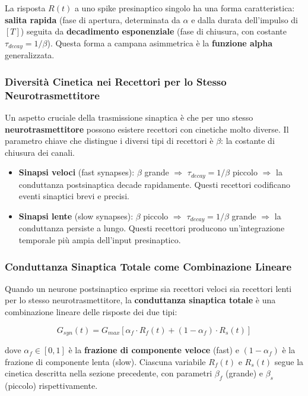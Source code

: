La risposta $R(t)$ a uno spike presinaptico singolo ha una forma caratteristica: \textbf{salita rapida} (fase di apertura, determinata da $\alpha$ e dalla durata dell'impulso di $[T]$) seguita da \textbf{decadimento esponenziale} (fase di chiusura, con costante $\tau_{decay} = 1/\beta$). Questa forma a campana asimmetrica è la \textbf{funzione alpha} generalizzata.


\subsubsection{Diversità Cinetica nei Recettori per lo Stesso Neurotrasmettitore}

Un aspetto cruciale della trasmissione sinaptica è che per uno stesso \textbf{neurotrasmettitore} possono esistere recettori con cinetiche molto diverse. Il parametro chiave che distingue i diversi tipi di recettori è $\beta$: la costante di chiusura dei canali.

\begin{itemize}
    \item \textbf{Sinapsi veloci} (fast synapses): $\beta$ grande $\Rightarrow$ $\tau_{decay} = 1/\beta$ piccolo $\Rightarrow$ la conduttanza postsinaptica decade rapidamente. Questi recettori codificano eventi sinaptici brevi e precisi.
    \item \textbf{Sinapsi lente} (slow synapses): $\beta$ piccolo $\Rightarrow$ $\tau_{decay} = 1/\beta$ grande $\Rightarrow$ la conduttanza persiste a lungo. Questi recettori producono un'integrazione temporale più ampia dell'input presinaptico.
\end{itemize}

\subsubsection{Conduttanza Sinaptica Totale come Combinazione Lineare}

Quando un neurone postsinaptico esprime sia recettori veloci sia recettori lenti per lo stesso neurotrasmettitore, la \textbf{conduttanza sinaptica totale} è una combinazione lineare delle risposte dei due tipi:

\begin{equation}
G_{syn}(t) = G_{max} \left[ \alpha_f \cdot R_f(t) + (1 - \alpha_f) \cdot R_s(t) \right]
\end{equation}

dove $\alpha_f \in [0,1]$ è la \textbf{frazione di componente veloce} (fast) e $(1 - \alpha_f)$ è la frazione di componente lenta (slow). Ciascuna variabile $R_f(t)$ e $R_s(t)$ segue la cinetica descritta nella sezione precedente, con parametri $\beta_f$ (grande) e $\beta_s$ (piccolo) rispettivamente.


